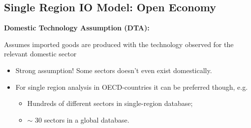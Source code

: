 \begin{multicols}{2}
 \subsection{Single Region IO Model: Open Economy}
 \textbf{Domestic Technology Assumption (DTA):}\par
 Assumes imported goods are produced with the technology observed for the relevant domestic sector
 \begin{itemize}
  \item Strong assumption! Some sectors doesn't even exist domestically.
  \item For single region analysis in OECD-countries it can be preferred though, e.g.
        \begin{itemize}
         \item Hundreds of different sectors in single-region database;
         \item $\sim$ 30 sectors in a global database.
        \end{itemize}
 \end{itemize}





\end{multicols}
